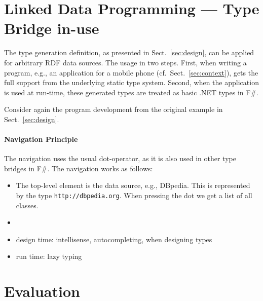 \documentclass{llncs} %
\newcommand{\fs}{\textsf{F\#}\xspace}
\begin{document}
	
\section{Linked Data Programming --- Type Bridge in-use}
\label{sec:usage}

The type generation definition, as presented in Sect.~\ref{sec:design}, can be applied for arbitrary RDF data sources.
The usage in two steps. First, when writing a program, e.g., an application for a mobile phone (cf.~Sect.~\ref{sec:context}),
gets the full support from the underlying static type system.
Second, when the application is used at run-time, these generated types are treated as basic .NET types in \fs.

Consider again the program development from the original example in Sect.~\ref{sec:design}.

\paragraph{Navigation Principle}

The navigation uses the usual dot-operator, as it is also used in other type bridges in \fs.
The navigation works as follows:
\begin{itemize}
	\item The top-level element is the data source, e.g., DBpedia. This is represented
	   by the type \texttt{http://dbpedia.org}. When pressing the dot we get a list of all
		 classes.
	\item 
\end{itemize}

\begin{itemize}
	\item design time: intellisense, autocompleting, when designing types
  \item run time: lazy typing
\end{itemize}


\section{Evaluation}
\label{sec:eval}


 
\end{document}
